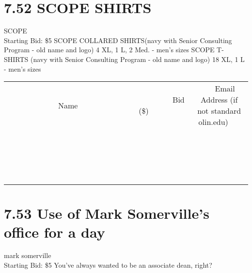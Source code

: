 \documentclass[11pt]{article}
\begin{document}
\section*{7.52 SCOPE SHIRTS}
SCOPE
\\
Starting Bid: \$5
\newline
SCOPE COLLARED SHIRTS(navy with Senior Consulting Program - old name and logo) 4 XL, 1 L, 2 Med. - men's sizes
SCOPE T-SHIRTS (navy with Senior Consulting Program - old name and logo) 18 XL, 1 L - men's sizes
\\[3ex]
\begin{tabular}{c c c}
~~~~~~~~~~~~~Name~~~~~~~~~~~~~ & ~~~~~~~~~Bid (\$)~~~~~~~~~  & ~~~Email Address (if not standard olin.edu)~~~\\
 & & \\
\hline
 & & \\
\hline
 & & \\
\hline
 & & \\
\hline
 & & \\
\hline
 & & \\
\hline
 & & \\
\hline
 & & \\
\hline
 & & \\
\hline
 & & \\
\hline
 & & \\
\hline
 & & \\
\hline
 & & \\
\hline
 & & \\
\hline
 & & \\
\hline
 & & \\
\hline
 & & \\
\hline
 & & \\
\hline
 & & \\
\hline
\end{tabular}
\newpage
\section*{7.53 Use of Mark Somerville's office for a day}
mark somerville
\\
Starting Bid: \$5
\newline
You've always wanted to be an associate dean, right?
\end{document}
